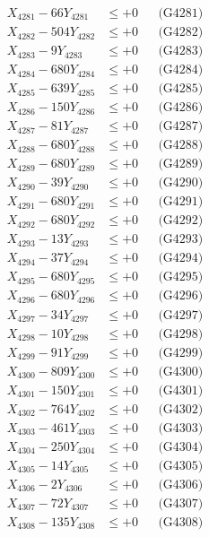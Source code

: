 \documentclass[a4paper,10pt]{article}
\begin{document}
{\begin{align}
\allowbreak
X_{4281} - 66Y_{4281} &\leq +0 && \text{(G4281)} \\
X_{4282} - 504Y_{4282} &\leq +0 && \text{(G4282)} \\
X_{4283} - 9Y_{4283} &\leq +0 && \text{(G4283)} \\
X_{4284} - 680Y_{4284} &\leq +0 && \text{(G4284)} \\
X_{4285} - 639Y_{4285} &\leq +0 && \text{(G4285)} \\
X_{4286} - 150Y_{4286} &\leq +0 && \text{(G4286)} \\
X_{4287} - 81Y_{4287} &\leq +0 && \text{(G4287)} \\
X_{4288} - 680Y_{4288} &\leq +0 && \text{(G4288)} \\
X_{4289} - 680Y_{4289} &\leq +0 && \text{(G4289)} \\
X_{4290} - 39Y_{4290} &\leq +0 && \text{(G4290)} \\
\allowbreak
X_{4291} - 680Y_{4291} &\leq +0 && \text{(G4291)} \\
X_{4292} - 680Y_{4292} &\leq +0 && \text{(G4292)} \\
X_{4293} - 13Y_{4293} &\leq +0 && \text{(G4293)} \\
X_{4294} - 37Y_{4294} &\leq +0 && \text{(G4294)} \\
X_{4295} - 680Y_{4295} &\leq +0 && \text{(G4295)} \\
X_{4296} - 680Y_{4296} &\leq +0 && \text{(G4296)} \\
X_{4297} - 34Y_{4297} &\leq +0 && \text{(G4297)} \\
X_{4298} - 10Y_{4298} &\leq +0 && \text{(G4298)} \\
X_{4299} - 91Y_{4299} &\leq +0 && \text{(G4299)} \\
X_{4300} - 809Y_{4300} &\leq +0 && \text{(G4300)} \\
\allowbreak
X_{4301} - 150Y_{4301} &\leq +0 && \text{(G4301)} \\
X_{4302} - 764Y_{4302} &\leq +0 && \text{(G4302)} \\
X_{4303} - 461Y_{4303} &\leq +0 && \text{(G4303)} \\
X_{4304} - 250Y_{4304} &\leq +0 && \text{(G4304)} \\
X_{4305} - 14Y_{4305} &\leq +0 && \text{(G4305)} \\
X_{4306} - 2Y_{4306} &\leq +0 && \text{(G4306)} \\
X_{4307} - 72Y_{4307} &\leq +0 && \text{(G4307)} \\
X_{4308} - 135Y_{4308} &\leq +0 && \text{(G4308)} \\

\end{align}}
\end{document}
